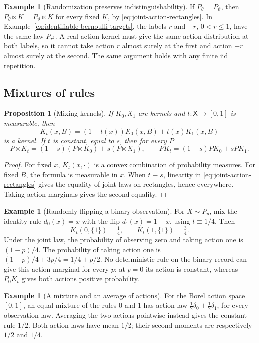 \documentclass[11pt,oneside]{book}
\newtheorem{proposition}[theorem]{Proposition}
\theoremstyle{definition}
\newtheorem{example}[theorem]{Example}
\theoremstyle{remark}
\begin{document}
\begin{example}[Randomization preserves indistinguishability]
\label{ex:randomized-indistinguishability}
If $P_\theta=P_\vartheta$, then $P_\theta\ltimes K=P_\vartheta\ltimes K$
for every fixed $K$, by \eqref{eq:joint-action-rectangles}.
In Example~\ref{ex:identifiable-bernoulli-targets}, the labels $r$ and
$-r$, $0<r\leq1$, have the same law $P_{r^2}$. A real-action kernel must
give the same action distribution at both labels, so it cannot take
action $r$ almost surely at the first and action $-r$ almost surely at
the second. The same argument holds with any finite iid repetition.
\end{example}

\subsection{Mixtures of rules}
\label{subsec:rule-mixtures}

\begin{proposition}[Mixing kernels]
\label{prop:mixture-rules}
If $K_0,K_1$ are kernels and $t:\mathsf X\to[0,1]$ is measurable, then
\[
K_t(x,B)=(1-t(x))K_0(x,B)+t(x)K_1(x,B)
\]
is a kernel. If $t$ is constant, equal to $s$, then for every $P$
\[
P\ltimes K_t=(1-s)(P\ltimes K_0)+s(P\ltimes K_1),\qquad
PK_t=(1-s)PK_0+sPK_1.
\]
\end{proposition}
\begin{proof}
For fixed $x$, $K_t(x,\cdot)$ is a convex combination of probability
measures. For fixed $B$, the formula is measurable in $x$.
When $t\equiv s$, linearity in \eqref{eq:joint-action-rectangles} gives
the equality of joint laws on rectangles, hence everywhere. Taking
action marginals gives the second equality.
\end{proof}

\begin{example}[Randomly flipping a binary observation]
\label{ex:binary-flip-rule}
For $X\sim P_p$, mix the identity rule $d_0(x)=x$ with the flip
$d_1(x)=1-x$, using $t\equiv1/4$. Then
\[
K_t(0,\{1\})=\tfrac14,\qquad K_t(1,\{1\})=\tfrac34.
\]
Under the joint law, the probability of observing zero and taking action
one is $(1-p)/4$. The probability of taking action one is
$(1-p)/4+3p/4=1/4+p/2$. No deterministic rule on the binary record can
give this action marginal for every $p$: at $p=0$ its action is constant,
whereas $P_0K_t$ gives both actions positive probability.
\end{example}

\begin{example}[A mixture and an average of actions]
\label{ex:mixing-versus-averaging-actions}
For the Borel action space $[0,1]$, an equal mixture of the rules $0$ and $1$
has action law $\tfrac12\delta_0+\tfrac12\delta_1$, for every observation law.
Averaging the two actions pointwise instead gives the constant rule $1/2$.
Both action laws have mean $1/2$; their second moments are respectively
$1/2$ and $1/4$.
\end{example}
\end{document}
